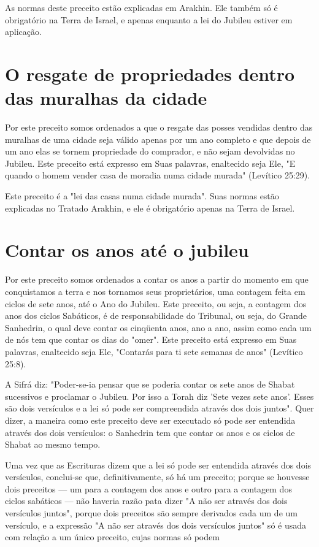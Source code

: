 \begin{itemize}
\begin{enumrate}
\begin{itemize}
\begin{itemize}
\begin{itemize}
As normas deste preceito estão explicadas em Arakhin. Ele também só é
obrigatório na Terra de Israel, e apenas enquanto a lei do Jubileu
estiver em aplicação.

\section{O resgate de propriedades dentro das muralhas da cidade}

Por este preceito somos ordenados a que o resgate das posses ven­didas
dentro das muralhas de uma cidade seja válido apenas por um ano
com­pleto e que depois de um ano elas se tornem propriedade do
comprador, e não sejam devolvidas no Jubileu. Este preceito está
expresso em Suas palavras, enal­tecido seja Ele, "E quando o homem
vender casa de moradia numa cidade mu­rada" (Levítico 25:29).

Este preceito é a "lei das casas numa cidade murada". Suas normas estão
explicadas no Tratado Arakhin, e ele é obrigatório apenas na Terra de
Israel.

\section{Contar os anos até o jubileu}

Por este preceito somos ordenados a contar os anos a partir do mo­mento
em que conquistamos a terra e nos tornamos seus proprietários, uma
contagem feita em ciclos de sete anos, até o Ano do Jubileu. Este
preceito, ou seja, a contagem dos anos dos ciclos Sabáticos, é de
responsabilidade do Tribu­nal, ou seja, do Grande Sanhedrin, o qual deve
contar os cinqüenta anos, ano a ano, assim como cada um de nós tem que
contar os dias do "omer". Este preceito está expresso em Suas palavras,
enaltecido seja Ele, "Contarás para ti sete semanas de anos" (Levítico
25:8).

A Sifrá diz: "Poder-se-ia pensar que se poderia contar os sete anos de
Shabat sucessivos e proclamar o Jubileu. Por isso a Torah diz 'Sete
vezes sete anos'. Esses são dois versículos e a lei só pode ser
compreendida através dos dois juntos". Quer dizer, a maneira como este
preceito deve ser executado só pode ser entendida através dos dois
versículos: o Sanhedrin tem que contar os anos e os ciclos de Shabat ao
mesmo tempo.

Uma vez que as Escrituras dizem que a lei só pode ser entendida atra­vés
dos dois versículos, conclui-se que, definitivamente, só há um preceito;
por­que se houvesse dois preceitos --- um para a contagem dos anos e
outro para a contagem dos ciclos sabáticos --- não haveria razão pata
dizer "A não ser atra­vés dos dois versículos juntos", porque dois
preceitos são sempre derivados cada um de um versículo, e a expressão "A
não ser através dos dois versículos juntos" só é usada com relação a um
único preceito, cujas normas só podem




\end{itemize}
\end{itemize}
\end{itemize}
\end{enumrate}
\end{itemize}
